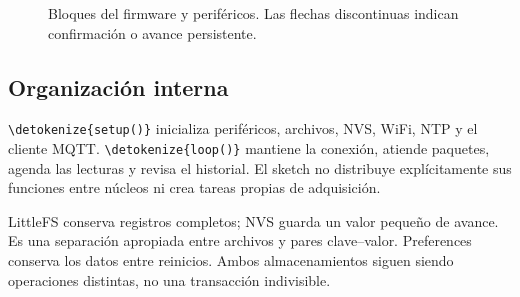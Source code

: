 \documentclass[11pt,a4paper]{article}
\newcommand{\code}[1]{\expandafter\nolinkurl\expandafter{\detokenize{#1}}}
\begin{document}
\begin{figure}[h!]
\caption{Bloques del firmware y periféricos. Las flechas discontinuas indican confirmación o avance persistente.}
\end{figure}

\subsection{Organización interna}
\code{setup()} inicializa periféricos, archivos, NVS, WiFi, NTP y el cliente MQTT. \code{loop()} mantiene la conexión, atiende paquetes, agenda las lecturas y revisa el historial. El sketch no distribuye explícitamente sus funciones entre núcleos ni crea tareas propias de adquisición.

LittleFS conserva registros completos; NVS guarda un valor pequeño de avance. Es una separación apropiada entre archivos y pares clave--valor. Preferences conserva los datos entre reinicios.\cite{preferences} Ambos almacenamientos siguen siendo operaciones distintas, no una transacción indivisible.
\end{document}
